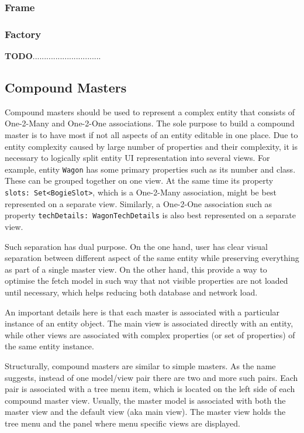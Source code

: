   
  \subsubsection{Frame}
  
  \subsubsection{Factory}  
  
  
  \textbf{TODO}..............................
  
\subsection{Compound Masters}

  Compound masters should be used to represent a complex entity that consists of One-2-Many and One-2-One associations.
  The sole purpose to build a compound master is to have most if not all aspects of an entity editable in one place.
  Due to entity complexity caused by large number of properties and their complexity, it is necessary to logically split entity UI representation into several views.
  For example, entity \texttt{Wagon} has some primary properties such as its number and class.
  These can be grouped together on one view.
  At the same time its property \texttt{slots: Set<BogieSlot>}, which is a One-2-Many association, might be best represented on a separate view.
  Similarly, a One-2-One association such as property \texttt{techDetails: WagonTechDetails} is also best represented on a separate view.
  
  Such separation has dual purpose.
  On the one hand, user has clear visual separation between different aspect of the same entity while preserving everything as part of a single master view.
  On the other hand, this provide a way to optimise the fetch model in such way that not visible properties are not loaded until necessary, which helps reducing both database and network load.
  
  An important details here is that each master is associated with a particular instance of an entity object.
  The main view is associated directly with an entity, while other views are associated with complex properties (or set of properties) of the same entity instance.
  
  Structurally, compound masters are similar to simple masters.
  As the name suggests, instead of one model/view pair there are two and more such pairs.
  Each pair is associated with a tree menu item, which is located on the left side of each compound master view.
  Usually, the master model is associated with both the master view and the default view (aka main view).
  The master view holds the tree menu and the panel where menu specific views are displayed.
  



